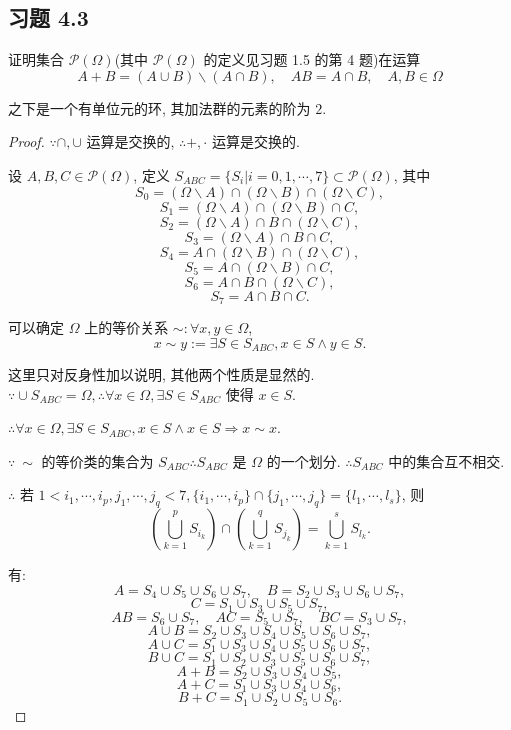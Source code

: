 \documentclass{ctexart}
\begin{document}
\subsection{习题 4.3}
\begin{exercise}[3.1]
    证明集合 $\mathcal{P}(\Omega)$(其中 $\mathcal{P}(\Omega)$ 的定义见习题 1.5 的第 4 题)在运算
    \[A+B=(A\cup B)\backslash(A\cap B),\quad AB=A\cap B,\quad A,B\in\Omega\]

    之下是一个有单位元的环, 其加法群的元素的阶为 $2$.
\end{exercise}
\begin{proof}
    $\because\cap,\cup$ 运算是交换的, $\therefore+,\cdot$ 运算是交换的.

    设 $A,B,C\in\mathcal{P}(\Omega)$, 定义
    $S_{ABC}=\{S_i|i=0,1,\cdots,7\}\subset\mathcal{P}(\Omega)$, 其中
    \[S_0=(\Omega\backslash A)\cap(\Omega\backslash B)\cap(\Omega\backslash C),\]
    \[S_1=(\Omega\backslash A)\cap(\Omega\backslash B)\cap C,\]
    \[S_2=(\Omega\backslash A)\cap B\cap(\Omega\backslash C),\]
    \[S_3=(\Omega\backslash A)\cap B\cap C,\]
    \[S_4=A\cap(\Omega\backslash B)\cap(\Omega\backslash C),\]
    \[S_5=A\cap(\Omega\backslash B)\cap C,\]
    \[S_6=A\cap B\cap(\Omega\backslash C),\]
    \[S_7=A\cap B\cap C.\]

    可以确定 $\Omega$ 上的等价关系 $\sim:\forall x,y\in\Omega$,
    \[x\sim y:=\exists S\in S_{ABC},x\in S\land y\in S.\]

    这里只对反身性加以说明, 其他两个性质是显然的. $\because\cup S_{ABC}=\Omega,\therefore\forall x\in\Omega,\exists S\in S_{ABC}$ 使得 $x\in S$.

    $\therefore\forall x\in\Omega,\exists S\in S_{ABC},x\in S\land x\in S\Rightarrow x\sim x$.

    $\because\ \sim$ 的等价类的集合为 $S_{ABC}\therefore S_{ABC}$ 是 $\Omega$ 的一个划分. $\therefore S_{ABC}$ 中的集合互不相交.

    $\therefore$ 若 $1<i_1,\cdots,i_p,j_1,\cdots,j_q<7,\{i_1,\cdots,i_p\}\cap\{j_1,\cdots,j_q\}=\{l_1,\cdots,l_s\}$, 则
    \[\left(\bigcup\limits_{k=1}^pS_{i_k}\right)\cap\left(\bigcup\limits_{k=1}^qS_{j_k}\right)=\bigcup\limits_{k=1}^sS_{l_k}.\]

    有:
    \[A=S_4\cup S_5\cup S_6\cup S_7,\quad B=S_2\cup S_3\cup S_6\cup S_7,\]
    \[C=S_1\cup S_3\cup S_5\cup S_7,\]
    \[AB=S_6\cup S_7,\quad AC=S_5\cup S_7,\quad BC=S_3\cup S_7,\]
    \[A\cup B=S_2\cup S_3\cup S_4\cup S_5\cup S_6\cup S_7,\]
    \[A\cup C=S_1\cup S_3\cup S_4\cup S_5\cup S_6\cup S_7,\]
    \[B\cup C=S_1\cup S_2\cup S_3\cup S_5\cup S_6\cup S_7,\]
    \[A+B=S_2\cup S_3\cup S_4\cup S_5,\]\[A+C=S_1\cup S_3\cup S_4\cup S_6,\]\[B+C=S_1\cup S_2\cup S_5\cup S_6.\]


\end{proof}
\end{document}
